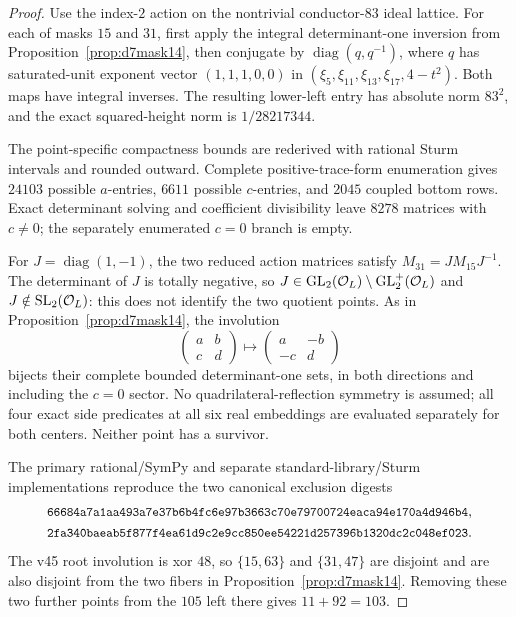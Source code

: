 \begin{proof}
Use the index-$2$ action on the nontrivial conductor-$83$ ideal lattice.  For
each of masks $15$ and $31$, first apply the integral determinant-one inversion
from Proposition~\ref{prop:d7mask14}, then conjugate by
$\operatorname{diag}(q,q^{-1})$, where $q$ has saturated-unit exponent vector
$(1,1,1,0,0)$ in $(\xi_5,\xi_{11},\xi_{13},\xi_{17},4-t^2)$.  Both maps have
integral inverses.  The resulting lower-left entry has absolute norm $83^2$,
and the exact squared-height norm is $1/28217344$.

The point-specific compactness bounds are rederived with rational Sturm
intervals and rounded outward.  Complete positive-trace-form enumeration gives
$24103$ possible $a$-entries, $6611$ possible $c$-entries, and $2045$ coupled
bottom rows.  Exact determinant solving and coefficient divisibility leave
$8278$ matrices with $c\ne0$; the separately enumerated $c=0$ branch is empty.

For $J=\operatorname{diag}(1,-1)$, the two reduced action matrices satisfy
$M_{31}=JM_{15}J^{-1}$.  The determinant of $J$ is totally negative, so
$J\in\operatorname{GL}_2(\mathcal O_L)\setminus\operatorname{GL}_2^+(\mathcal O_L)$ and $J\notin\operatorname{SL}_2(\mathcal O_L)$: this does not
identify the two quotient points.  As in Proposition~\ref{prop:d7mask14}, the
involution
\[
 \begin{pmatrix}a&b\\c&d\end{pmatrix}
 \longmapsto
 \begin{pmatrix}a&-b\\-c&d\end{pmatrix}
\]
bijects their complete bounded determinant-one sets, in both directions and
including the $c=0$ sector.  No quadrilateral-reflection symmetry is assumed;
all four exact side predicates at all six real embeddings are evaluated
separately for both centers.  Neither point has a survivor.

The primary rational/SymPy and separate standard-library/Sturm implementations
reproduce the two canonical exclusion digests
\[
\begin{gathered}
\digest{66684a7a1aa493a7e37b6b4fc6e97b36}{63c70e79700724eaca94e170a4d946b4},\\
\digest{2fa340baeab5f877f4ea61d9c2e9cc85}{0ee54221d257396b1320dc2c048ef023}.
\end{gathered}
\]
The v45 root involution is xor $48$, so $\{15,63\}$ and $\{31,47\}$ are
disjoint and are also disjoint from the two fibers in
Proposition~\ref{prop:d7mask14}.  Removing these two further points from the
$105$ left there gives $11+92=103$.
\end{proof}


